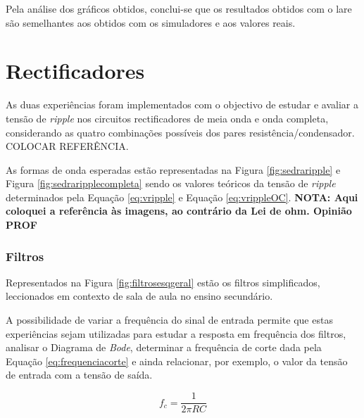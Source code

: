 Pela análise dos gráficos obtidos, conclui-se que os resultados obtidos com o \acrshort{lare} são semelhantes aos obtidos com os simuladores e aos valores reais.

\section{Rectificadores}
As duas experiências foram implementados com o objectivo de estudar e avaliar a tensão de \textit{ripple} nos circuitos rectificadores de meia onda e onda completa, considerando as quatro combinações possíveis dos pares resistência/condensador. COLOCAR REFERÊNCIA.

As formas de onda esperadas estão representadas na Figura \ref{fig:sedraripple} e Figura \ref{fig:sedraripplecompleta} sendo os valores teóricos da tensão de \textit{ripple} determinados pela Equação \ref{eq:vripple} e Equação \ref{eq:vrippleOC}. \textbf{NOTA: Aqui coloquei a referência às imagens, ao contrário da Lei de ohm. Opinião PROF}

\subsubsection{Filtros}
\label{sec:filtros}
Representados na Figura \ref{fig:filtrosesqgeral} estão os filtros simplificados, leccionados em contexto de sala de aula no ensino secundário.

A possibilidade de variar a frequência do sinal de entrada permite que estas experiências sejam utilizadas para estudar a resposta em frequência dos filtros, analisar o Diagrama de \textit{Bode}, determinar a frequência de corte dada pela Equação \ref{eq:frequenciacorte} e ainda relacionar, por exemplo, o valor da tensão de entrada com a tensão de saída. 

\begin{equation} \label{eq:frequenciacorte}
	f_{c} = \frac{1}{2\pi RC}
\end{equation}

